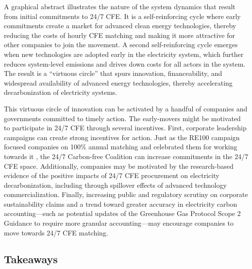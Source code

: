 \documentclass[pdflatex,sn-basic, Numbered]{sn-jnl}
\theoremstyle{thmstyleone}%
\theoremstyle{thmstyletwo}%
\theoremstyle{thmstylethree}%
\begin{document}

A graphical abstract illustrates the nature of the system dynamics that result from initial commitments to 24/7 CFE. It is a self-reinforcing cycle where early commitments create a market for advanced clean energy technologies, thereby reducing the costs of hourly CFE matching and making it more attractive for other companies to join the movement. A second self-reinforcing cycle emerges when new technologies are adopted early in the electricity system, which further reduces system-level emissions and drives down costs for all actors in the system. The result is a \enquote{virtuous circle} that spurs innovation, financeability, and widespread availability of advanced energy technologies, thereby accelerating decarbonization of electricity systems.

This virtuous circle of innovation can be activated by a handful of companies and governments committed to timely action. The early-movers might be motivated to participate in 24/7 CFE through several incentives. First, corporate leadership campaigns can create strong incentives for action. Just as the RE100 campaign focused companies on 100\% annual matching and celebrated them for working towards it \cite{re100RE1002023Annual2024}, the 24/7 Carbon-free Coalition can increase commitments in the 24/7 CFE space. Additionally, companies may be motivated by the research-based evidence of the positive impacts of 24/7 CFE procurement on electricity decarbonization, including through spillover effects of advanced technology commercialization. Finally, increasing public and regulatory scrutiny on corporate sustainability claims and a trend toward greater accuracy in electricity carbon accounting---such as potential updates of the Greenhouse Gas Protocol Scope 2 Guidance to require more granular accounting---may encourage companies to move towards 24/7 CFE matching.

\subsection*{Takeaways}\label{sec6}
\end{document}
